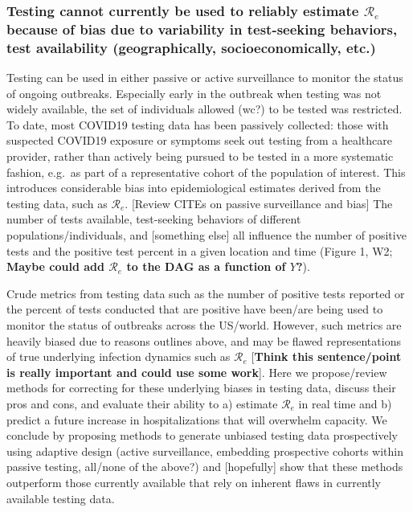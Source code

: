 \documentclass[
]{article}
\begin{document}
\hypertarget{testing-cannot-currently-be-used-to-reliably-estimate-mathcalr_e-because-of-bias-due-to-variability-in-test-seeking-behaviors-test-availability-geographically-socioeconomically-etc.}{%
\subsubsection{\texorpdfstring{Testing cannot currently be used to
reliably estimate \(\mathcal{R}_e\) because of bias due to variability
in test-seeking behaviors, test availability (geographically,
socioeconomically,
etc.)}{Testing cannot currently be used to reliably estimate \textbackslash mathcal\{R\}\_e because of bias due to variability in test-seeking behaviors, test availability (geographically, socioeconomically, etc.)}}\label{testing-cannot-currently-be-used-to-reliably-estimate-mathcalr_e-because-of-bias-due-to-variability-in-test-seeking-behaviors-test-availability-geographically-socioeconomically-etc.}}

Testing can be used in either passive or active surveillance to monitor
the status of ongoing outbreaks. Especially early in the outbreak when
testing was not widely available, the set of individuals allowed (wc?)
to be tested was restricted. To date, most COVID19 testing data has been
passively collected: those with suspected COVID19 exposure or symptoms
seek out testing from a healthcare provider, rather than actively being
pursued to be tested in a more systematic fashion, e.g.~as part of a
representative cohort of the population of interest. This introduces
considerable bias into epidemiological estimates derived from the
testing data, such as \(\mathcal{R}_e\). {[}Review CITEs on passive
surveillance and bias{]} The number of tests available, test-seeking
behaviors of different populations/individuals, and {[}something else{]}
all influence the number of positive tests and the positive test percent
in a given location and time (Figure 1, W2; \textbf{Maybe could add
\(\mathcal{R}_e\) to the DAG as a function of \(Y\)?}).

Crude metrics from testing data such as the number of positive tests
reported or the percent of tests conducted that are positive have
been/are being used to monitor the status of outbreaks across the
US/world. However, such metrics are heavily biased due to reasons
outlines above, and may be flawed representations of true underlying
infection dynamics such as \(\mathcal{R}_e\) {[}\textbf{Think this
sentence/point is really important and could use some work}{]}. Here we
propose/review methods for correcting for these underlying biases in
testing data, discuss their pros and cons, and evaluate their ability to
a) estimate \(\mathcal{R}_e\) in real time and b) predict a future
increase in hospitalizations that will overwhelm capacity. We conclude
by proposing methods to generate unbiased testing data prospectively
using adaptive design (active surveillance, embedding prospective
cohorts within passive testing, all/none of the above?) and
{[}hopefully{]} show that these methods outperform those currently
available that rely on inherent flaws in currently available testing
data.
\end{document}
